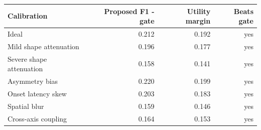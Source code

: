 \begin{tabular}{lrrr}
\toprule
Calibration & Proposed F1 - gate & Utility margin & Beats gate \\
\midrule
Ideal & 0.212 & 0.192 & yes \\
Mild shape attenuation & 0.196 & 0.177 & yes \\
Severe shape attenuation & 0.158 & 0.141 & yes \\
Asymmetry bias & 0.220 & 0.199 & yes \\
Onset latency skew & 0.203 & 0.183 & yes \\
Spatial blur & 0.159 & 0.146 & yes \\
Cross-axis coupling & 0.164 & 0.153 & yes \\
\bottomrule
\end{tabular}
